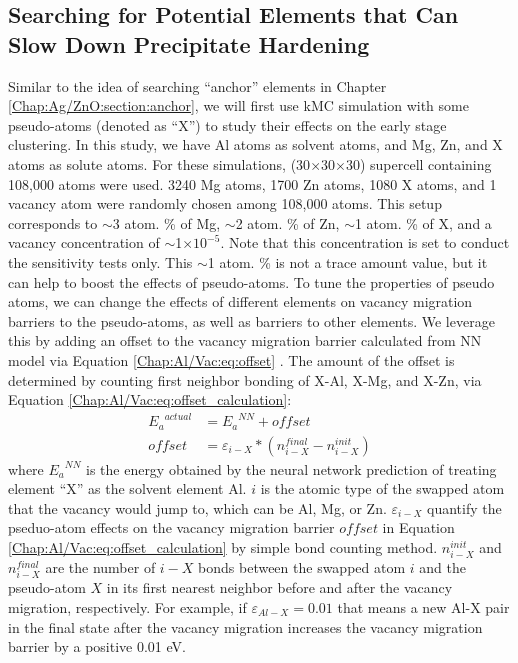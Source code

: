 \subsection{Searching for Potential Elements that Can Slow Down Precipitate Hardening}
\label{Chap:Al/Vac:pseudo}
Similar to the idea of searching ``anchor'' elements in Chapter \ref{Chap:Ag/ZnO:section:anchor}, we will first use \ac{kMC} simulation with some pseudo-atoms (denoted as ``X'') to study their effects on the early stage clustering. In this study, we have Al atoms as solvent atoms, and Mg, Zn, and X atoms as solute atoms. For these simulations, (30$\times$30$\times$30) supercell containing 108,000 atoms were used. 3240 Mg atoms, 1700 Zn atoms, 1080 X atoms, and 1 vacancy atom were randomly chosen among 108,000 atoms. This setup corresponds to $\sim$3 atom. \% of Mg, $\sim$2 atom. \% of Zn, $\sim$1 atom. \% of X, and a vacancy concentration of $\sim$1$\times10^{-5}$. Note that this concentration is set to conduct the sensitivity tests only. This $\sim$1 atom. \% is not a trace amount value, but it can help to boost the effects of pseudo-atoms. To tune the properties of pseudo atoms, we can change the effects of different elements on vacancy migration barriers to the pseudo-atoms, as well as barriers to other elements. We leverage this by adding an offset to the vacancy migration barrier calculated from \ac{NN} model via Equation \ref{Chap:Al/Vac:eq:offset} . The amount of the offset is determined by counting first neighbor bonding of X-Al, X-Mg, and X-Zn, via Equation \ref{Chap:Al/Vac:eq:offset_calculation}:
\begin{subequations}
\begin{align}
{E_a}^{actual} & = {E_a}^{NN} + \textit{offset} \label{Chap:Al/Vac:eq:offset} \\
\textit{offset} & = \varepsilon_{i-X} * ( n_{i-X}^{final} - n_{i-X}^{init}) \label{Chap:Al/Vac:eq:offset_calculation}
\end{align}
\end{subequations}
where ${E_a}^{NN}$ is the energy obtained by the neural network prediction of treating element ``X'' as the solvent element Al. $i$ is the atomic type of the swapped atom that the vacancy would jump to, which can be Al, Mg, or Zn. $\varepsilon_{i-X}$ quantify the pseduo-atom effects on the vacancy migration barrier $offset$ in Equation \ref{Chap:Al/Vac:eq:offset_calculation} by simple bond counting method. $n_{i-X}^{init}$ and $n_{i-X}^{final}$ are the number of $i-X$ bonds between the swapped atom $i$ and the pseudo-atom $X$ in its first nearest neighbor before and after the vacancy migration, respectively. For example, if $\varepsilon_{Al-X} = 0.01$ that means a new Al-X pair in the final state after the vacancy migration increases the vacancy migration barrier by a positive 0.01 eV.


